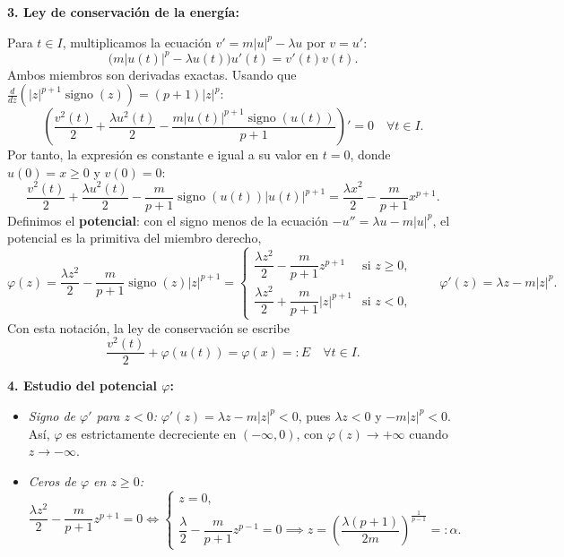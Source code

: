 {    \textbf{3. Ley de conservación de la energía:}

    Para $t \in I$, multiplicamos la ecuación $v' = m|u|^p - \lambda u$ por $v = u'$:
    \[
        \big( m|u(t)|^p - \lambda u(t) \big) u'(t) = v'(t) v(t).
    \]
    Ambos miembros son derivadas exactas. Usando que $\frac{d}{dz} \left( |z|^{p+1} \operatorname{signo}(z) \right) = (p+1)|z|^p$:
    \[
        \left( \frac{v^2(t)}{2} + \frac{\lambda u^2(t)}{2} - \frac{m |u(t)|^{p+1} \operatorname{signo}(u(t))}{p+1} \right)' = 0 \quad \forall t \in I.
    \]
    Por tanto, la expresión es constante e igual a su valor en $t = 0$, donde $u(0) = x \ge 0$ y $v(0) = 0$:
    \[
        \frac{v^2(t)}{2} + \frac{\lambda u^2(t)}{2} - \frac{m}{p+1} \operatorname{signo}(u(t)) |u(t)|^{p+1} = \frac{\lambda x^2}{2} - \frac{m}{p+1} x^{p+1}.
    \]
    Definimos el \textbf{potencial}: con el signo menos de la ecuación $-u'' = \lambda u - m|u|^p$, el potencial es la primitiva del miembro derecho,
    \[
        \varphi(z) = \frac{\lambda z^2}{2} - \frac{m}{p+1} \operatorname{signo}(z) |z|^{p+1} =
        \begin{cases}
            \dfrac{\lambda z^2}{2} - \dfrac{m}{p+1} z^{p+1} & \text{si } z \ge 0, \\[1em]
            \dfrac{\lambda z^2}{2} + \dfrac{m}{p+1} |z|^{p+1} & \text{si } z < 0,
        \end{cases}
        \qquad \varphi'(z) = \lambda z - m |z|^p.
    \]
    Con esta notación, la ley de conservación se escribe
    \[
        \boxed{\frac{v^2(t)}{2} + \varphi(u(t)) = \varphi(x) =: E \quad \forall t \in I.}
    \]

    \textbf{4. Estudio del potencial $\varphi$:}
    \begin{itemize}
        \item \textit{Signo de $\varphi'$ para $z < 0$:} $\varphi'(z) = \lambda z - m|z|^p < 0$, pues $\lambda z < 0$ y $-m|z|^p < 0$. Así, $\varphi$ es estrictamente decreciente en $(-\infty, 0)$, con $\varphi(z) \to +\infty$ cuando $z \to -\infty$.

        \item \textit{Ceros de $\varphi$ en $z \ge 0$:}
        \[
            \frac{\lambda z^2}{2} - \frac{m}{p+1} z^{p+1} = 0 \iff
            \begin{cases}
                z = 0, \\
                \dfrac{\lambda}{2} - \dfrac{m}{p+1} z^{p-1} = 0 \implies z = \left( \dfrac{\lambda (p+1)}{2m} \right)^{\frac{1}{p-1}} =: \alpha.
            \end{cases}
        \]


\end{itemize}}
